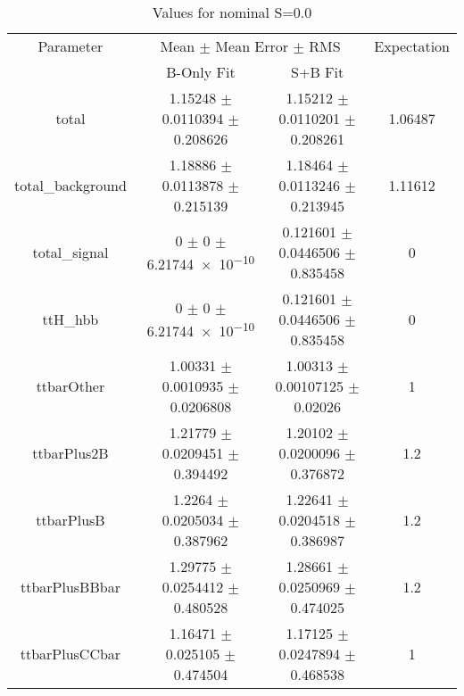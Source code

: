 \begin{table}
\centering
\caption{Values for nominal S=0.0}
\begin{tabular}{cccc}
\toprule
Parameter & \multicolumn{2}{c}{Mean $\pm$ Mean Error $\pm$ RMS} & Expectation\\
 & B-Only Fit & S+B Fit & \\
\midrule
total & \num{1.15248} $\pm$ \num{0.0110394} $\pm$ \num{0.208626} & \num{1.15212} $\pm$ \num{0.0110201} $\pm$ \num{0.208261} & \num{1.06487}\\
total\_background & \num{1.18886} $\pm$ \num{0.0113878} $\pm$ \num{0.215139} & \num{1.18464} $\pm$ \num{0.0113246} $\pm$ \num{0.213945} & \num{1.11612}\\
total\_signal & \num{0} $\pm$ \num{0} $\pm$ \num{6.21744e-10} & \num{0.121601} $\pm$ \num{0.0446506} $\pm$ \num{0.835458} & \num{0}\\
ttH\_hbb & \num{0} $\pm$ \num{0} $\pm$ \num{6.21744e-10} & \num{0.121601} $\pm$ \num{0.0446506} $\pm$ \num{0.835458} & \num{0}\\
ttbarOther & \num{1.00331} $\pm$ \num{0.0010935} $\pm$ \num{0.0206808} & \num{1.00313} $\pm$ \num{0.00107125} $\pm$ \num{0.02026} & \num{1}\\
ttbarPlus2B & \num{1.21779} $\pm$ \num{0.0209451} $\pm$ \num{0.394492} & \num{1.20102} $\pm$ \num{0.0200096} $\pm$ \num{0.376872} & \num{1.2}\\
ttbarPlusB & \num{1.2264} $\pm$ \num{0.0205034} $\pm$ \num{0.387962} & \num{1.22641} $\pm$ \num{0.0204518} $\pm$ \num{0.386987} & \num{1.2}\\
ttbarPlusBBbar & \num{1.29775} $\pm$ \num{0.0254412} $\pm$ \num{0.480528} & \num{1.28661} $\pm$ \num{0.0250969} $\pm$ \num{0.474025} & \num{1.2}\\
ttbarPlusCCbar & \num{1.16471} $\pm$ \num{0.025105} $\pm$ \num{0.474504} & \num{1.17125} $\pm$ \num{0.0247894} $\pm$ \num{0.468538} & \num{1}\\
\bottomrule
\end{tabular}
\end{table}